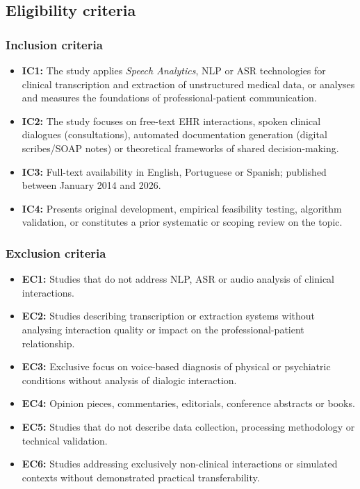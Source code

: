 \documentclass[review,12pt]{elsarticle}
\begin{document}
\subsection{Eligibility criteria}

\subsubsection{Inclusion criteria}
\begin{itemize}
  \item \textbf{IC1:} The study applies \textit{Speech Analytics}, NLP or ASR
        technologies for clinical transcription and extraction of unstructured
        medical data, or analyses and measures the foundations of
        professional-patient communication.
  \item \textbf{IC2:} The study focuses on free-text EHR interactions, spoken
        clinical dialogues (consultations), automated documentation generation
        (digital scribes/SOAP notes) or theoretical frameworks of shared
        decision-making.
  \item \textbf{IC3:} Full-text availability in English, Portuguese or Spanish;
        published between January 2014 and 2026.
  \item \textbf{IC4:} Presents original development, empirical feasibility
        testing, algorithm validation, or constitutes a prior systematic or
        scoping review on the topic.
\end{itemize}

\subsubsection{Exclusion criteria}
\begin{itemize}
  \item \textbf{EC1:} Studies that do not address NLP, ASR or audio analysis
        of clinical interactions.
  \item \textbf{EC2:} Studies describing transcription or extraction systems
        without analysing interaction quality or impact on the
        professional-patient relationship.
  \item \textbf{EC3:} Exclusive focus on voice-based diagnosis of physical or
        psychiatric conditions without analysis of dialogic interaction.
  \item \textbf{EC4:} Opinion pieces, commentaries, editorials, conference
        abstracts or books.
  \item \textbf{EC5:} Studies that do not describe data collection, processing
        methodology or technical validation.
  \item \textbf{EC6:} Studies addressing exclusively non-clinical interactions
        or simulated contexts without demonstrated practical transferability.
\end{itemize}
\end{document}

